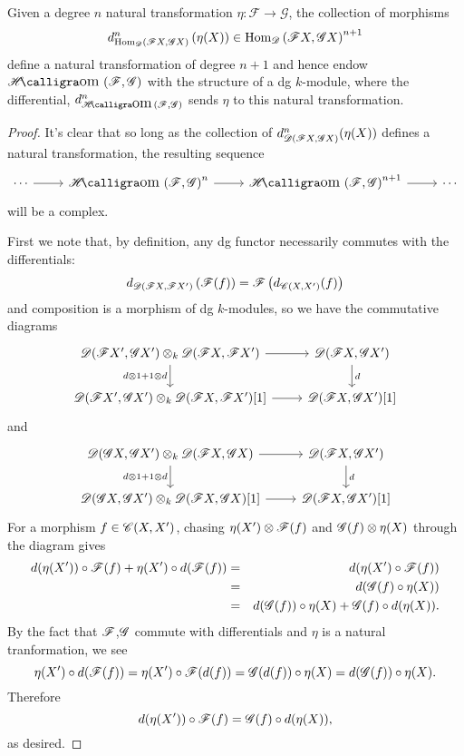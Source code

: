 \documentclass[dissertation.tex]{subfiles}
\begin{document}
\begin{prop}
  Given a degree $n$ natural transformation $\eta \colon \mathscr{F} \rightarrow \mathscr{G}$, the collection of morphisms
  $$d^n_{\operatorname{Hom}_{\mathscr{D}}\left(\mathscr{F}X, \mathscr{G}X\right)}\left( \eta(X) \right) \in \operatorname{Hom}_{\mathscr{D}}\left(\mathscr{F}X, \mathscr{G}X\right)^{n+1}$$
  define a natural transformation of degree $n + 1$ and hence endow $\SHom{\mathscr{F},\mathscr{G}}$ with the structure of a dg $k$-module, where the differential, $d_{\SHom{\mathscr{F},\mathscr{G}}}^n$ sends $\eta$ to this natural transformation.
  
  \begin{proof}
    It's clear that so long as the collection of $d^n_{\mathscr{D}(\mathscr{F} X, \mathscr{G} X)}(\eta(X))$ defines a natural transformation, the resulting sequence
    $$\begin{tikzcd}
      \cdots \arrow{r} & \SHom{\F, \G}^n \arrow{r} & \SHom{\F,\G}^{n+1} \arrow{r} & \cdots
    \end{tikzcd}$$
    will be a complex.
    
    First we note that, by definition, any dg functor necessarily commutes with the differentials:
    $$d_{\mathscr{D}(\mathscr{F}X, \mathscr{F}X^\prime)}\left(\mathscr{F}(f) \right) = \mathscr{F}\left(d_{\mathscr{C}(X,X^\prime)}(f)\right)$$
    and composition is a morphism of dg $k$-modules, so we have the commutative diagrams
    $$\begin{tikzcd}
      \D(\F X^\prime, \G X^\prime) \otimes_k \D(\F X, \F X^\prime) \arrow{r}\arrow[swap]{d}{d \otimes 1 + 1 \otimes d}& \D(\F X, \G X^\prime)\arrow{d}{d}\\
      \D(\F X^\prime, \G X^\prime) \otimes_k \D(\F X, \F X^\prime)[1] \arrow{r}& \D(\F X, \G X^\prime)[1]
    \end{tikzcd}$$
    and
    $$\begin{tikzcd}
      \D(\G X, \G X^\prime) \otimes_k \D(\F X, \G X) \arrow{r}\arrow[swap]{d}{d \otimes 1 + 1 \otimes d}& \D(\F X, \G X^\prime)\arrow{d}{d}\\
      \D(\G X, \G X^\prime) \otimes_k \D(\F X, \G X)[1] \arrow{r}& \D(\F X, \G X^\prime)[1]
    \end{tikzcd}$$
    For a morphism $f \in \mathscr{C}(X,X^\prime)$, chasing $\eta(X^\prime) \otimes \mathscr{F}(f)$ and $\mathscr{G}(f) \otimes \eta(X)$ through the diagram gives
    \begin{eqnarray*}
      d(\eta(X^\prime)) \circ \mathscr{F}(f) + \eta(X^\prime) \circ d(\mathscr{F}(f)) 
      &=& d(\eta(X^\prime) \circ \mathscr{F}(f))\\
      &=& d(\mathscr{G}(f) \circ \eta(X))\\
      &=& d(\mathscr{G}(f)) \circ \eta(X) + \mathscr{G}(f) \circ d(\eta(X)).
    \end{eqnarray*}
    By the fact that $\mathscr{F}$,$\mathscr{G}$ commute with differentials and $\eta$ is a natural tranformation, we see
    $$\eta(X^\prime) \circ d(\mathscr{F}(f)) = \eta(X^\prime) \circ \mathscr{F}(d(f)) = \mathscr{G}(d(f)) \circ \eta(X) = d(\mathscr{G}(f)) \circ \eta(X).$$
    Therefore
    $$d(\eta(X^\prime)) \circ \mathscr{F}(f) = \mathscr{G}(f) \circ d(\eta(X)),$$
    as desired.
  \end{proof}
\end{prop}
\end{document}
